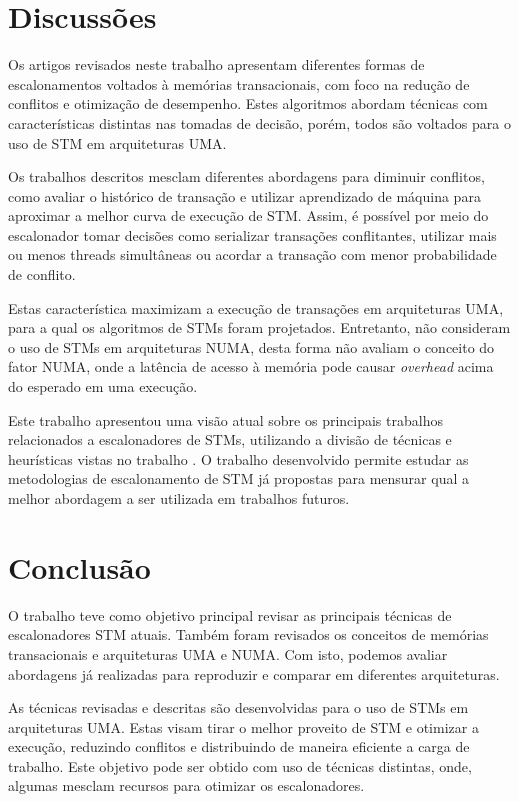 \documentclass[ti]{texufpel}
\begin{document}
\chapter{Discussões}

Os artigos revisados neste trabalho apresentam diferentes formas de escalonamentos voltados à memórias transacionais, com foco na redução de conflitos e otimização de desempenho. Estes algoritmos abordam técnicas com características distintas nas tomadas de decisão, porém, todos são voltados para o uso de STM em arquiteturas UMA.

Os trabalhos descritos mesclam diferentes abordagens para diminuir conflitos, como avaliar o histórico de transação e utilizar aprendizado de máquina para aproximar a melhor curva de execução de STM. Assim, é possível por meio do escalonador tomar decisões como serializar transações conflitantes, utilizar mais ou menos threads simultâneas ou acordar a transação com menor probabilidade de conflito.

Estas característica maximizam a execução de transações em arquiteturas UMA, para a qual os algoritmos de STMs foram projetados. Entretanto, não consideram o uso de STMs em arquiteturas NUMA, desta forma não avaliam o conceito do fator NUMA, onde a latência de acesso à memória pode causar \emph{overhead} acima do esperado em uma execução.

Este trabalho apresentou uma visão atual sobre os principais trabalhos relacionados a escalonadores de STMs, utilizando a divisão de técnicas e heurísticas vistas no trabalho \cite{sanzo17}. O trabalho desenvolvido permite estudar as metodologias de escalonamento de STM já propostas para mensurar qual a melhor abordagem a ser utilizada em trabalhos futuros.

\chapter{Conclusão}

O trabalho teve como objetivo principal revisar as principais técnicas de escalonadores STM atuais. Também foram revisados os conceitos de memórias transacionais e arquiteturas UMA e NUMA. Com isto, podemos avaliar abordagens já realizadas para reproduzir e comparar em diferentes arquiteturas.

As técnicas revisadas e descritas são desenvolvidas para o uso de STMs em arquiteturas UMA. Estas visam tirar o melhor proveito de STM e otimizar a execução, reduzindo conflitos e distribuindo de maneira eficiente a carga de trabalho. Este objetivo pode ser obtido com uso de técnicas distintas, onde, algumas mesclam recursos para otimizar os escalonadores.
\end{document}
